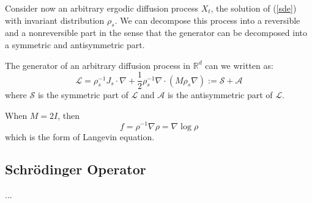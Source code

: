 Consider now an arbitrary ergodic diffusion process $X_t$, the solution of (\ref{sde}) with invariant distribution $\rho_s$.
We can decompose this process into a reversible and a nonreversible part in the sense that the generator  can be decomposed into a symmetric and antisymmetric part.

\begin{theorem}
    The generator of an arbitrary diffusion process in $\mathbb{R}^d$ can we written as:
    \begin{equation}
        \mathcal{L} = \rho_s^{-1}J_s\cdot \nabla + \frac{1}{2}\rho_s^{-1}\nabla\cdot\left(M\rho_s\nabla\right):=\mathcal{S}+\mathcal{A}
    \end{equation}
    where $\mathcal{S}$ is the symmetric part of $\mathcal{L}$ and $\mathcal{A}$ is the antisymmetric part of $\mathcal{L}$.
\end{theorem}

\begin{example}
    When $M = 2I$, then 
    \begin{equation}
        f = \rho^{-1}\nabla\rho = \nabla \log \rho
    \end{equation}
    which is the form of Langevin equation.
\end{example}
\subsection{Schrödinger Operator}
...

